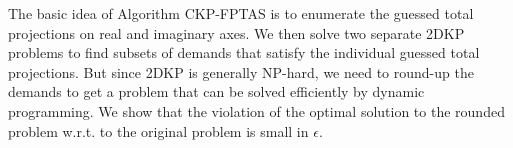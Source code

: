 The basic idea of Algorithm {\sc CKP-FPTAS} is to enumerate the guessed total projections on real and imaginary axes.%
We then solve two separate {\sc 2DKP} problems  to find subsets of demands that satisfy the individual guessed total projections. But since {\sc 2DKP} is generally NP-hard, we need to round-up the demands to get a problem that can be solved efficiently by dynamic programming. We show that the violation of the optimal solution to the rounded problem w.r.t. to the original problem is small in $\epsilon$. 

